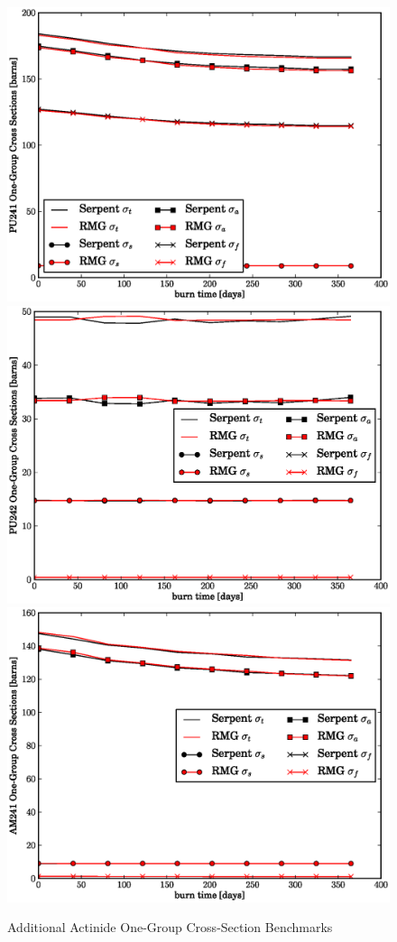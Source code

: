 \begin{figure}[htbp]
\caption{Additional Actinide One-Group Cross-Section Benchmarks}
\label{act_xs_benchmark_cont}
\begin{center}
\includegraphics[scale=0.3]{multigroup_method/figs/benchmark/PU241_1g_xs.eps}
\includegraphics[scale=0.3]{multigroup_method/figs/benchmark/PU242_1g_xs.eps}
\includegraphics[scale=0.3]{multigroup_method/figs/benchmark/AM241_1g_xs.eps}

\end{center}
\end{figure}
